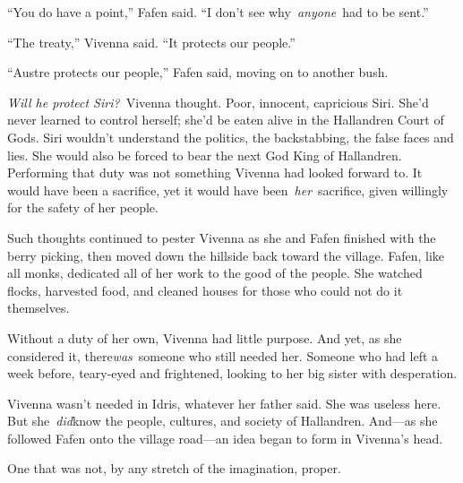 “You do have a point,” Fafen said. “I don’t see why~\textit{anyone}~had to be sent.”

“The treaty,” Vivenna said. “It protects our people.”

“Austre protects our people,” Fafen said, moving on to another bush.

\textit{Will he protect Siri?}~Vivenna thought. Poor, innocent, capricious Siri. She’d never learned to control herself; she’d be eaten alive in the Hallandren Court of Gods. Siri wouldn’t understand the politics, the backstabbing, the false faces and lies. She would also be forced to bear the next God King of Hallandren. Performing that duty was not something Vivenna had looked forward to. It would have been a sacrifice, yet it would have been~\textit{her}~sacrifice, given willingly for the safety of her people.

Such thoughts continued to pester Vivenna as she and Fafen finished with the berry picking, then moved down the hillside back toward the village. Fafen, like all monks, dedicated all of her work to the good of the people. She watched flocks, harvested food, and cleaned houses for those who could not do it themselves.

Without a duty of her own, Vivenna had little purpose. And yet, as she considered it, there\textit{was}~someone who still needed her. Someone who had left a week before, teary-eyed and frightened, looking to her big sister with desperation.

Vivenna wasn’t needed in Idris, whatever her father said. She was useless here. But she~\textit{did}know the people, cultures, and society of Hallandren. And—as she followed Fafen onto the village road—an idea began to form in Vivenna’s head.

One that was not, by any stretch of the imagination, proper.

